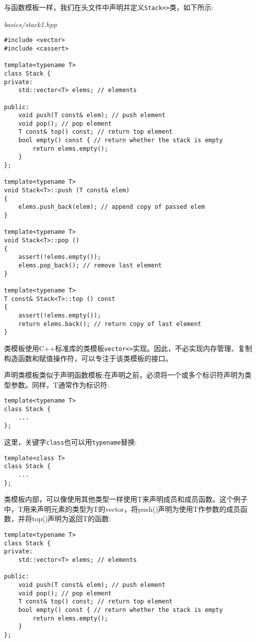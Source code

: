 
与函数模板一样，我们在头文件中声明并定义\texttt{Stack<>}类，如下所示:

\noindent
\textit{basics/stack1.hpp}
\begin{lstlisting}[style=styleCXX]
#include <vector>
#include <cassert>

template<typename T>
class Stack {
private:
	std::vector<T> elems; // elements
	
public:
	void push(T const& elem); // push element
	void pop(); // pop element
	T const& top() const; // return top element
	bool empty() const { // return whether the stack is empty
		return elems.empty();
	}
};

template<typename T>
void Stack<T>::push (T const& elem)
{
	elems.push_back(elem); // append copy of passed elem
}

template<typename T>
void Stack<T>::pop ()
{
	assert(!elems.empty());
	elems.pop_back(); // remove last element
}

template<typename T>
T const& Stack<T>::top () const
{
	assert(!elems.empty());
	return elems.back(); // return copy of last element
}
\end{lstlisting}

类模板使用C++标准库的类模板\texttt{vector<>}实现。因此，不必实现内存管理、复制构造函数和赋值操作符，可以专注于该类模板的接口。


声明类模板类似于声明函数模板:在声明之前，必须将一个或多个标识符声明为类型参数。同样，T通常作为标识符:

\begin{lstlisting}[style=styleCXX]
template<typename T>
class Stack {
	...
};
\end{lstlisting}

这里，关键字\texttt{class}也可以用\texttt{typename}替换:

\begin{lstlisting}[style=styleCXX]
template<class T>
class Stack {
	...
};
\end{lstlisting}

类模板内部，可以像使用其他类型一样使用T来声明成员和成员函数。这个例子中，T用来声明元素的类型为T的vector，将push()声明为使用T作参数的成员函数，并将top()声明为返回T的函数:

\begin{lstlisting}[style=styleCXX]
template<typename T>
class Stack {
private:
	std::vector<T> elems; // elements
	
public:
	void push(T const& elem); // push element
	void pop(); // pop element
	T const& top() const; // return top element
	bool empty() const { // return whether the stack is empty
		return elems.empty();
	}
};
\end{lstlisting}

